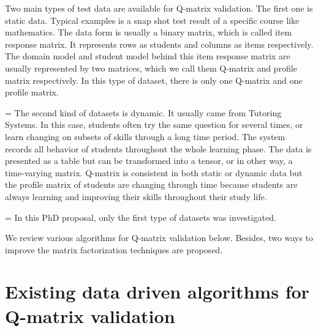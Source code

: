 \documentclass[12pt]{article}
\begin{document}
Two main types of test data are available for Q-matrix validation. The first one is static data. Typical examples is a snap shot test result of a specific course like mathematics. The data form is usually a binary matrix, which is called item response matrix. It represents rows as students and columns as items respectively. The domain model and student model behind this item response matrix are usually represented by two matrices, which we call them Q-matrix and profile matrix respectively. In this type of dataset, there is only one Q-matrix and one profile matrix.

\parskip = \baselineskip 
The second kind of datasets is dynamic. It usually came from Tutoring Systems. In this case, students often try the same question for several times, or learn changing on subsets of skills through a long time period. The system records all behavior of students throughout the whole learning phase. The data is presented as a table but can be transformed into a tensor, or in other way, a time-varying matrix. Q-matrix is consistent in both static or dynamic data but the profile matrix of students are changing through time because students are always learning and improving their skills throughout their study life.

\parskip = \baselineskip
In this PhD proposal, only the first type of datasets was investigated.

We review various algorithms for Q-matrix validation below. Besides, two ways to improve the matrix factorization techniques are proposed. 

\section{Existing data driven algorithms for Q-matrix validation}
\end{document}
